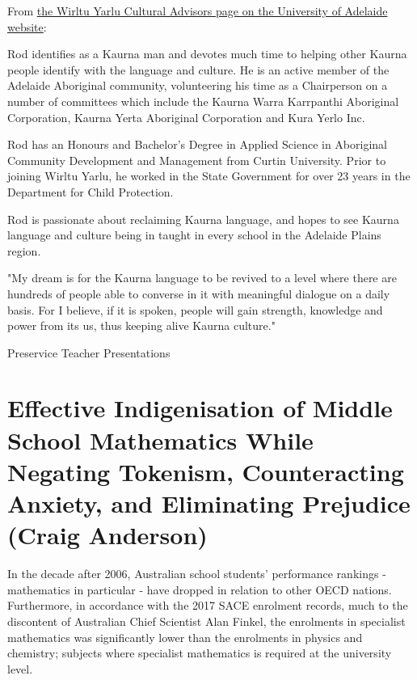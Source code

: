 \documentclass[twoside,12pt,a4paper,notitlepage]{memoir}
\begin{document}
From \href{https://www.adelaide.edu.au/wirltu-yarlu/cultural-advisors/}{the Wirltu Yarlu Cultural Advisors page on the University of Adelaide website}:

Rod identifies as a Kaurna man and devotes much time to helping other Kaurna people identify with the language and culture. He is an active member of the Adelaide Aboriginal community, volunteering his time as a Chairperson on a number of committees which include the Kaurna Warra Karrpanthi Aboriginal Corporation, Kaurna Yerta Aboriginal Corporation and Kura Yerlo Inc.

Rod has an Honours and Bachelor's Degree in Applied Science in Aboriginal Community Development and Management from Curtin University. Prior to joining Wirltu Yarlu, he worked in the State Government for over 23 years in the Department for Child Protection.

Rod is passionate about reclaiming Kaurna language, and hopes to see Kaurna language and culture being in taught in every school in the Adelaide Plains region.

"My dream is for the Kaurna language to be revived to a level where there are hundreds of people able to converse in it with meaningful dialogue on a daily basis. For I believe, if it is spoken, people will gain strength, knowledge and power from its us, thus keeping alive Kaurna culture."



\clearpage{}
\vspace*{2cm}
{\Huge Preservice Teacher Presentations}
\vspace{2cm}


\section*{Effective Indigenisation of Middle School Mathematics While Negating Tokenism, Counteracting Anxiety, and Eliminating Prejudice (Craig Anderson)}
\label{aut:anderson}

In the decade after 2006, Australian school students’ performance rankings - mathematics in particular - have dropped in relation to other OECD nations. Furthermore, in accordance with the 2017 SACE enrolment records, much to the discontent of Australian Chief Scientist Alan Finkel, the enrolments in specialist mathematics was significantly lower than the enrolments in physics and chemistry; subjects where specialist mathematics is required at the university level.
\end{document}
